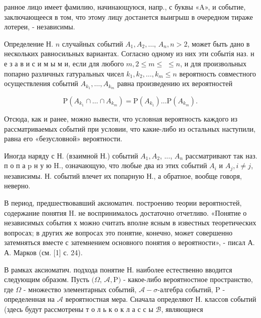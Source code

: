 \documentclass[10pt]{article}
\begin{document}
ранное лицо имеет фамилию, начинающуюся, напр., с буквы «A», и событие, заключающееся в том, что этому лицу достанется выигрыш в очередном тираже лотереи, - независимы.



Определение Н. $n$ случайных событий $A_{1}, A_{2}, \ldots$, $A_{n}, n>2$, может быть дано в нескольких равносильных вариантах. Согласно одному из них эти событія наз. н е з а в и с и м ы м и, если для любого $m, 2 \leqslant m \leqslant$ $\leqslant n$, и для произвольных попарно различных гатуральных чисел $k_{1}, k_{2}, \ldots, k_{m} \leqslant n$ вероятность совместного осуществления событий $A_{k_{1}}, \ldots, A_{k_{m}}$ равна произведению их вероятностей



\[

\mathrm{P}\left(A_{k_{1}} \cap \ldots \cap A_{k_{m}}\right)=\mathrm{P}\left(A_{k_{1}}\right) \ldots \mathrm{P}\left(A_{k_{m}}\right) \text {. }

\]



Отсюда, как и ранее, можно вывести, что условная вероятность каждого из рассматриваемых событий при условии, что какие-либо из остальных наступили, равна его «безусловной» вероятности.



Иногда наряду с Н. (взаимной Н.) событий $A_{1}, A_{2}$, ..., $A_{n}$ рассматривают так наз. п о п а $\mathrm{p}$ н у ю $\mathrm{H}$., означающую, что любые два из этих событий $A_{i}$ и $A_{j}, i \neq j$, независимы. Н. событий влечет их попарную Н., а обратное, вообще говоря, неверно.



В период, предшествовавший аксиоматич. построению теории вероятностей, содержание понятия $\mathrm{H}$. не воспринималось достаточно отчетливо. «Понятие о независимых события х можно считать вполне ясным в известных теоретических вопросах; в других же вопросах это понятие, конечно, может совершенно затемняться вместе с затемнением основного понятия о вероятности», - писал А. А. Марков (см. [1] с. 24).



В рамках аксиоматич. подхода понятие Н. наиболее естественно вводится следующим образом. Пусть $(\Omega$, $\mathcal{A}, \mathrm{P})$ - какое-либо вероятностное пространство, где $\Omega$ - множество элементарных событий, $\mathcal{A}-\sigma$-алгебра событий, $\mathrm{P}$ - определенная на $\mathcal{A}$ вероятностная мера. Сначала определяют Н. классов событий (здесь будут рассмотрены т о л ь к о к л а с с ы $\mathscr{B}$, являющиеся
\end{document}
